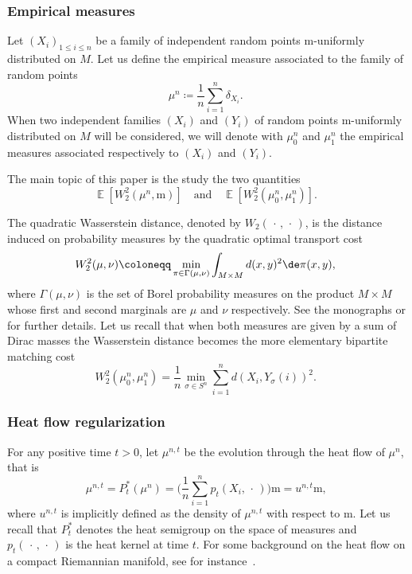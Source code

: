 \documentclass[10pt]{amsart}
\theoremstyle{plain}
\theoremstyle{definition}
\numberwithin{equation}{section}
\newcommand{\defeq}{\ensuremath{\coloneqq}}
\newcommand{\E}[1]{\ensuremath{\operatorname{\mathbb{E}}\left[#1\right]}}
\newcommand{\emptyparam}{\ensuremath{\,\cdot\,}}
\renewcommand{\comma}{\ensuremath{\text{, }}}
\newcommand{\comma}{\ensuremath{\text{, }}}
\newcommand{\fullstop}{\ensuremath{\text{. }}}
\newcommand{\m}{\ensuremath{\mathrm m}}
\begin{document}
\subsubsection{Empirical measures}
Let $(X_i)_{1\le i\le n}$ be a family of independent random points $\m$-uniformly distributed on $M$.
Let us define the empirical measure associated to the family of random points
\begin{equation*}
\mu^n \defeq \frac1n \sum_{i=1}^n \delta_{X_i} \fullstop
\end{equation*}
When two independent families $(X_i)$ and $(Y_i)$ of random points $\m$-uniformly distributed on $M$ will
be considered, we will denote with $\mu_0^n$ and $\mu_1^n$ the empirical measures associated respectively to
$(X_i)$ and $(Y_i)$.

The main topic of this paper is the study the two quantities
\begin{equation*}
\E{W_2^2(\mu^n, \m)} \quad\text{and}\quad \E{W_2^2(\mu_0^n, \mu_1^n)} \fullstop
\end{equation*}

The quadratic Wasserstein distance, denoted by $W_2(\emptyparam, \emptyparam)$, is the distance induced on
probability measures by the quadratic optimal transport cost
\begin{equation*}
W_2^2(\mu, \nu) \defeq \min_{\pi\in\Gamma(\mu, \nu)} \int_{M\times M} d(x, y)^2\de\pi(x, y) \comma
\end{equation*}
where $\Gamma(\mu,\nu)$ is the set of Borel probability measures on the product $M\times M$ whose first and
second marginals are $\mu$ and $\nu$ respectively. See the monographs \cite{Villani09} or \cite{Santambrogio15} for
further details.
Let us recall that when both measures are given by a sum of Dirac masses the Wasserstein distance becomes the
more elementary bipartite matching cost
\begin{equation*}
W_2^2(\mu_0^n, \mu_1^n) = \frac1n \min_{\sigma\in S^n}\sum_{i=1}^n d\left(X_i, Y_\sigma(i)\right)^2 \fullstop
\end{equation*}

\subsubsection{Heat flow regularization}\label{subsec:heat_flow_reg}
For any positive time $t>0$, let $\mu^{n,t}$ be the evolution through the heat flow of $\mu^n$, that is
\begin{equation*}
\mu^{n,t} = P^*_t(\mu^n) = \biggl(\frac1n \sum_{i=1}^n p_t(X_i, \emptyparam)\biggr)\m = u^{n,t}\m \comma
\end{equation*}
where $u^{n,t}$ is implicitly defined as the density of $\mu^{n,t}$ with respect to $\m$. Let us recall that
$P_t^*$ denotes the heat semigroup on the space of measures and $p_t(\emptyparam,\emptyparam)$ is the
heat kernel at time $t$. For some background on the heat flow on a compact Riemannian manifold,
see for instance~\cite[Chap.\,6]{Chavel84}.
\end{document}
